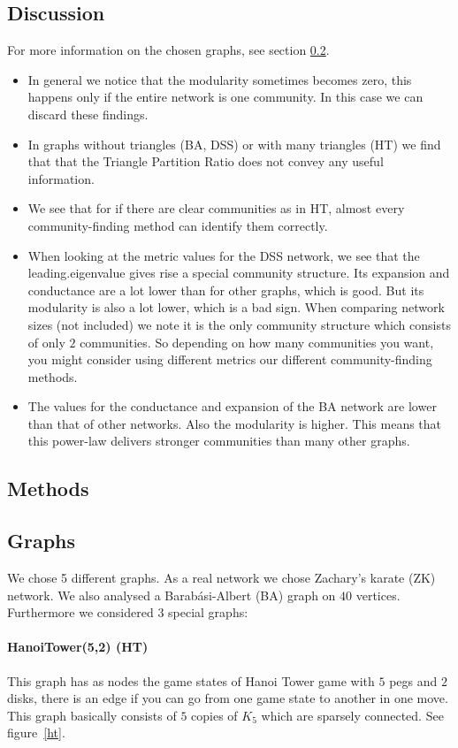\documentclass[paper=a4, fontsize=11pt]{scrartcl} %
\begin{document}
\subsection{Discussion}
For more information on the chosen graphs, see section \ref{meth}. 
\begin{itemize}
\item In general we notice that the modularity sometimes becomes zero, this happens only if the entire network is one community. In this case we can discard these findings.
\item In graphs without triangles (BA, DSS) or with many triangles (HT) we find that that the Triangle Partition Ratio does not convey any useful information.
\item We see that for if there are clear communities as in HT, almost every community-finding method can identify them correctly.
\item When looking at the metric values for the DSS network, we see that the leading.eigenvalue gives rise a special community structure. Its expansion and conductance are a lot lower than for other graphs, which is good. But its modularity is also a lot lower, which is a bad sign. When comparing network sizes (not included) we note it is the only community structure which consists of only $2$ communities. So depending on how many communities you want, you might consider using different metrics our different community-finding methods.
\item The values for the conductance and expansion of the BA network are lower than that of other networks. Also the modularity is higher. This means that this power-law delivers stronger communities than many other graphs.
\end{itemize}


\subsection{Methods}\label{meth}
\subsection{Graphs}
We chose 5 different graphs. As a real network we chose Zachary's karate (ZK) network. We also analysed a Barab\'{a}si-Albert (BA) graph on $40$ vertices.
Furthermore we considered $3$ special graphs:
\paragraph{HanoiTower(5,2) (HT)}
This graph has as nodes the game states of Hanoi Tower game with $5$ pegs and $2$ disks, there is an edge if you can go from one game state to another in one move. This graph basically consists of $5$ copies of $K_{5}$ which are sparsely connected. See figure~\ref{ht}.
\end{document}
